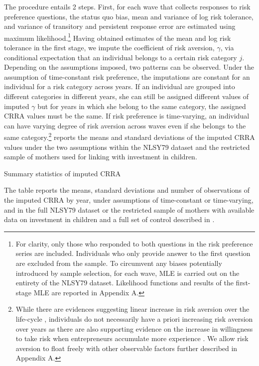 \documentclass[]{article}
\begin{document}
The procedure entails 2 steps. First, for each wave that collects responses to risk preference questions, the status quo bias, mean and variance of log risk tolerance, and variance of transitory and persistent response error are estimated using maximum likelihood.\footnote{For clarity, only those who responded to both questions in the risk preference series are included. Individuals who only provide answer to the first question are excluded from the sample. To circumvent any biases potentially introduced by sample selection, for each wave, MLE is carried out on the entirety of the NLSY79 dataset. Likelihood functions and results of the first-stage MLE are reported in \alert{Appendix A}.} Having obtained estimates of the mean and log risk tolerance in the first stage, we impute the coefficient of risk aversion, $\gamma$, via conditional expectation that an individual belongs to a certain risk category $j$. Depending on the assumptions imposed, two patterns can be observed. Under the assumption of time-constant risk preference, the imputations are constant for an individual for a risk category across years. \alert{If an individual are grouped into different categories in different years, she can still be assigned different values of imputed $\gamma$ but for years in which she belong to the same category, the assigned CRRA values must be the same.} If risk preference is time-varying, an individual can have varying degree of risk aversion across waves even if she belongs to the same category.\footnote{While there are evidences suggesting linear increase in risk aversion over the life-cycle \citep{dohmen2017risk}, individuals do not necessarily have a priori increasing risk aversion over years as there are also supporting evidence on the increase in willingness to take risk when entrepreneurs accumulate more experience  \citep{brachert2017simultaneity,cho2021endogenous}. We allow risk aversion to float freely with other observable factors further described in \alert{Appendix A}.}  reports the means and standard deviations of the imputed CRRA values under the two assumptions within the NLSY79 dataset and the restricted sample of mothers used for linking with investment in children.

\begin{table}
	\centering
	\setlength{\extrarowheight}{0.3em}
	\begin{threeparttable}
		\caption{Summary statistics of imputed CRRA}	
		
		\label{table:CRRA-summary}
	\begin{tablenotes}[flushleft]\footnotesize
		\item The table reports the means, standard deviations and number of observations of the imputed CRRA by year, under assumptions of time-constant or time-varying, and in the full NLSY79 dataset or the restricted sample of mothers with available data on investment in children and a full set of control described in .
	\end{tablenotes}
	\end{threeparttable}
\end{table}    
\end{document}
